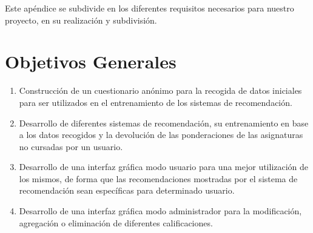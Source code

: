 Este apéndice se subdivide en los diferentes requisitos necesarios para nuestro proyecto, en su realización y subdivisión. 
\section{Objetivos Generales}
\begin{enumerate}
\item Construcción de un cuestionario anónimo para la recogida de datos iniciales para ser utilizados en el entrenamiento de los sistemas de recomendación. 
\item Desarrollo de diferentes sistemas de recomendación, su entrenamiento en base a los datos recogidos y la devolución de las ponderaciones de las asignaturas no cursadas por un usuario. 
\item Desarrollo de una interfaz gráfica modo usuario para una mejor utilización de los mismos, de forma que las recomendaciones mostradas por el sistema de recomendación sean específicas para determinado usuario. 
\item Desarrollo de una interfaz gráfica modo administrador para la modificación, agregación o eliminación de diferentes calificaciones. 
\end{enumerate}
